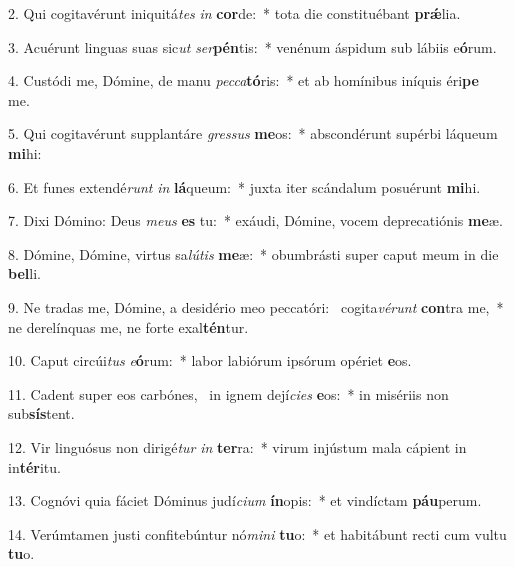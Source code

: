 2. Qui cogitavérunt iniquitá\textit{tes} \textit{in} \textbf{cor}de:~*  tota die constituébant \textbf{prǽ}lia.\

3. Acuérunt linguas suas sic\textit{ut} \textit{ser}\textbf{pén}tis:~*  venénum áspidum sub lábiis e\textbf{ó}rum.\

4. Custódi me, Dómine, de manu \textit{pec}\textit{ca}\textbf{tó}ris:~*  et ab homínibus iníquis éri\textbf{pe} me.\

5. Qui cogitavérunt supplantáre \textit{gres}\textit{sus} \textbf{me}os:~*  abscondérunt supérbi láqueum \textbf{mi}hi:\

6. Et funes extendé\textit{runt} \textit{in} \textbf{lá}queum:~*  juxta iter scándalum posuérunt \textbf{mi}hi.\

7. Dixi Dómino: Deus \textit{me}\textit{us} \textbf{es} tu:~*  exáudi, Dómine, vocem deprecatiónis \textbf{me}æ.\

8. Dómine, Dómine, virtus sa\textit{lú}\textit{tis} \textbf{me}æ:~*  obumbrásti super caput meum in die \textbf{bel}li.\

9. Ne tradas me, Dómine, a desidério meo peccatóri: \dag\  cogita\textit{vé}\textit{runt} \textbf{con}tra me,~*  ne derelínquas me, ne forte exal\textbf{tén}tur.\

10. Caput circúi\textit{tus} \textit{e}\textbf{ó}rum:~*  labor labiórum ipsórum opériet \textbf{e}os.\

11. Cadent super eos carbónes, \dag\  in ignem dejí\textit{ci}\textit{es} \textbf{e}os:~*  in misériis non sub\textbf{sís}tent.\

12. Vir linguósus non dirigé\textit{tur} \textit{in} \textbf{ter}ra:~*  virum injústum mala cápient in in\textbf{tér}itu.\

13. Cognóvi quia fáciet Dóminus judí\textit{ci}\textit{um} \textbf{ín}opis:~*  et vindíctam \textbf{páu}perum.\

14. Verúmtamen justi confitebúntur nó\textit{mi}\textit{ni} \textbf{tu}o:~*  et habitábunt recti cum vultu \textbf{tu}o.\


